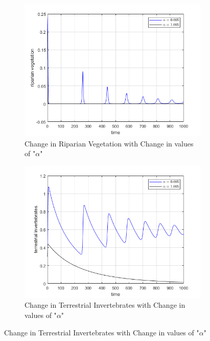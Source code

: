 \documentclass[12pt]{article}
\numberwithin{equation}{section}
\begin{document}
\FloatBarrier
\begin{figure}[bp!]
	\centering
	\begin{subfigure}[t]{0.45\textwidth}
		\centering
	\includegraphics[width=\textwidth]{time_vs_riparian_alpha.png}
		\caption{Change in Riparian Vegetation with Change in values of "$\alpha$"} \label{fig:time_vs_riparian_alpha}
	\end{subfigure}
\hspace{0.08\textwidth}
        \begin{subfigure}[t]{0.45\textwidth}
                 \centering
         \includegraphics[width=\textwidth]{time_vs_invertebrates_alpha.png}
		\caption{Change in Terrestrial Invertebrates with Change in values of "$\alpha$"} \label{fig:time_vs_invertebrates_alpha}

\end{subfigure}
\end{figure}
\end{document}
